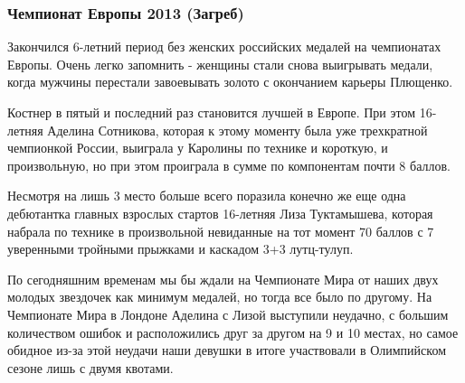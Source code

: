  
 
 
 
 

\subsubsection{Чемпионат Европы 2013 (Загреб)}
\label{sec:04_01_2022.yz.figurka_ot_maksima_jagudina.1.chempionaty_evropy.3.zagreb_2013}

Закончился 6-летний период без женских российских медалей на чемпионатах
Европы. Очень легко запомнить - женщины стали снова выигрывать медали, когда
мужчины перестали завоевывать золото с окончанием карьеры Плющенко.


Костнер в пятый и последний раз становится лучшей в Европе. При этом 16-летняя
Аделина Сотникова, которая к этому моменту была уже трехкратной чемпионкой
России, выиграла у Каролины по технике и короткую, и произвольную, но при этом
проиграла в сумме по компонентам почти 8 баллов.


Несмотря на лишь 3 место больше всего поразила конечно же еще одна дебютантка
главных взрослых стартов 16-летняя Лиза Туктамышева, которая набрала по технике
в произвольной невиданные на тот момент 70 баллов с 7 уверенными тройными
прыжками и каскадом 3+3 лутц-тулуп. 

По сегодняшним временам мы бы ждали на Чемпионате Мира от наших двух молодых
звездочек как минимум медалей, но тогда все было по другому. На Чемпионате Мира
в Лондоне Аделина с Лизой выступили неудачно, с большим количеством ошибок и
расположились друг за другом на 9 и 10 местах, но самое обидное из-за этой
неудачи наши девушки в итоге участвовали в Олимпийском сезоне лишь с двумя
квотами. 

